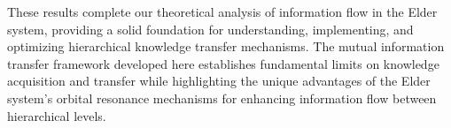 These results complete our theoretical analysis of information flow in the Elder system, providing a solid foundation for understanding, implementing, and optimizing hierarchical knowledge transfer mechanisms. The mutual information transfer framework developed here establishes fundamental limits on knowledge acquisition and transfer while highlighting the unique advantages of the Elder system's orbital resonance mechanisms for enhancing information flow between hierarchical levels.